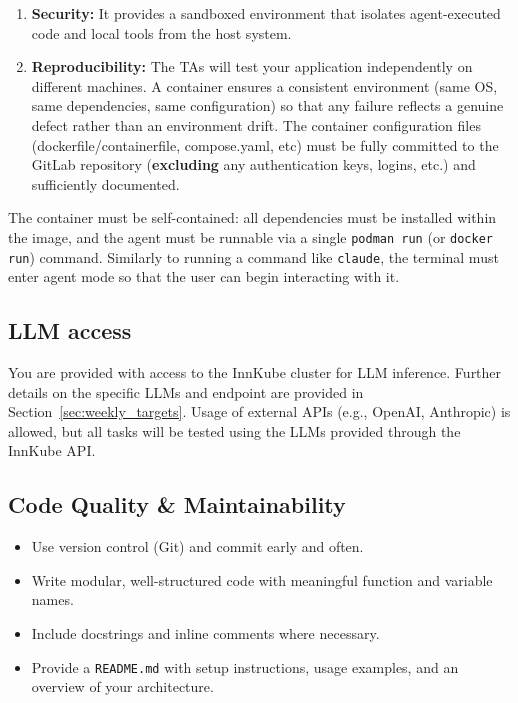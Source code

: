 \documentclass{article}
\begin{document}
\begin{enumerate}
    \item \textbf{Security:} It provides a sandboxed environment that isolates agent-executed code and local tools from the host system.
    \item \textbf{Reproducibility:} The TAs will test your application independently on different machines. A container ensures a consistent environment (same OS, same dependencies, same configuration) so that any failure reflects a genuine defect rather than an environment drift. The container configuration files (dockerfile/containerfile, compose.yaml, etc) must be fully committed to the GitLab repository (\textbf{excluding} any authentication keys, logins, etc.) and sufficiently documented.
\end{enumerate}

\noindent The container must be self-contained: all dependencies must be installed within the image, and the agent must be runnable via a single \texttt{podman run} (or \texttt{docker run}) command. Similarly to running a command like \texttt{claude}, the terminal must enter agent mode so that the user can begin interacting with it.

\subsection{LLM access}

You are provided with access to the InnKube cluster for LLM inference. Further details on the specific LLMs and endpoint are provided in Section~\ref{sec:weekly_targets}. Usage of external APIs (e.g., OpenAI, Anthropic) is allowed, but all tasks will be tested using the LLMs provided through the InnKube API.

\subsection{Code Quality \& Maintainability}

\begin{itemize}
    \item Use version control (Git) and commit early and often.
    \item Write modular, well-structured code with meaningful function and variable names.
    \item Include docstrings and inline comments where necessary.
    \item Provide a \texttt{README.md} with setup instructions, usage examples, and an overview of your architecture.
\end{itemize}
\end{document}
